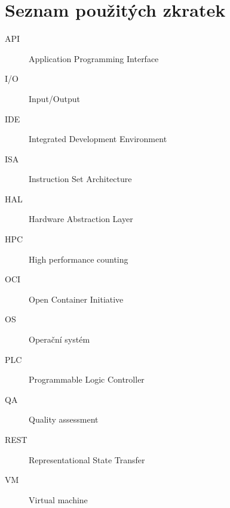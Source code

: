 \chapter{Seznam použitých zkratek}
\begin{description}
	\item[API] Application Programming Interface
	\item[I/O] Input/Output
	\item[IDE] Integrated Development Environment 
	\item[ISA] Instruction Set Architecture 
	\item[HAL] Hardware Abstraction Layer
	\item[HPC] High performance counting
	\item[OCI] Open Container Initiative
	\item[OS] Operační systém 
	\item[PLC] Programmable Logic Controller
	\item[QA] Quality assessment 
	\item[REST] Representational State Transfer
	\item[VM] Virtual machine
\end{description}